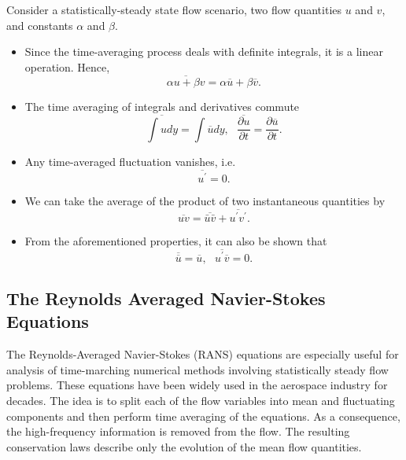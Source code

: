 Consider a statistically-steady state flow scenario, two flow quantities $u$ and $v$, and constants $\alpha$ and $\beta$.

\begin{itemize}
\item Since the time-averaging process deals with definite integrals, it is a linear operation. Hence, 
\begin{equation}
	\overline{\alpha u + \beta v} = \alpha \overline{u} + \beta \overline{v}.
	\label{eq:reynolds_sum}
\end{equation}
\item The time averaging of integrals and derivatives commute
\begin{equation}
	\overline{\int u dy} = \int \overline{u} dy,  ~~~ \overline{\frac{\partial u}{\partial t}} = \frac{\partial \overline{u}}{\partial t}.
	\label{eq:reynolds_commute}
\end{equation}
\item Any time-averaged fluctuation vanishes, i.e. 
\begin{equation}
	\overline{u^\prime}=0.
	\label{eq:reynolds_fluct}
\end{equation}
\item We can take the average of the product of two instantaneous quantities by
\begin{equation}
	\overline{uv} = \overline{\bar{u}\bar{v}} + \overline{u^\prime v^\prime}.
	\label{eq:reynolds_prod}
\end{equation}
\item From the aforementioned properties, it can also be shown that
\begin{equation}
	\overline{\overline{u}} = \overline{u}, ~~~ \overline{u^\prime \overline{v}} = 0.
\end{equation}
\end{itemize}

\subsection{The Reynolds Averaged Navier-Stokes Equations}

The Reynolds-Averaged Navier-Stokes (RANS) equations are especially useful for analysis of time-marching numerical methods involving statistically steady flow problems. These equations have been widely used in the aerospace industry for decades. The idea is to split each of the flow variables into mean and fluctuating components and then perform time averaging of the equations. As a consequence, the high-frequency information is removed from the flow. The resulting conservation laws describe only the evolution of the mean flow quantities. 


